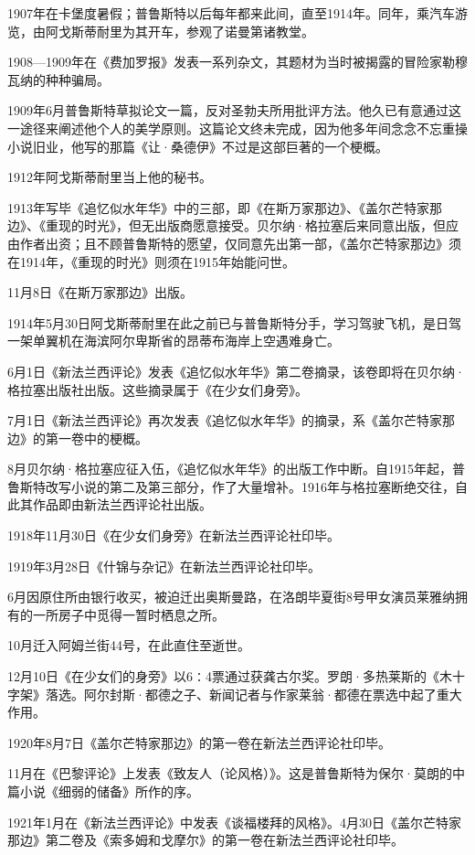 \par 1907年在卡堡度暑假；普鲁斯特以后每年都来此间，直至1914年。同年，乘汽车游览，由阿戈斯蒂耐里为其开车，参观了诺曼第诸教堂。
\par 1908—1909年在《费加罗报》发表一系列杂文，其题材为当时被揭露的冒险家勒穆瓦纳的种种骗局。
\par 1909年6月普鲁斯特草拟论文一篇，反对圣勃夫所用批评方法。他久已有意通过这一途径来阐述他个人的美学原则。这篇论文终未完成，因为他多年间念念不忘重操小说旧业，他写的那篇《让·桑德伊》不过是这部巨著的一个梗概。
\par 1912年阿戈斯蒂耐里当上他的秘书。
\par 1913年写毕《追忆似水年华》中的三部，即《在斯万家那边》、《盖尔芒特家那边》、《重现的时光》，但无出版商愿意接受。贝尔纳·格拉塞后来同意出版，但应由作者出资；且不顾普鲁斯特的愿望，仅同意先出第一部，《盖尔芒特家那边》须在1914年，《重现的时光》则须在1915年始能问世。
\par 11月8日《在斯万家那边》出版。
\par 1914年5月30日阿戈斯蒂耐里在此之前已与普鲁斯特分手，学习驾驶飞机，是日驾一架单翼机在海滨阿尔卑斯省的昂蒂布海岸上空遇难身亡。
\par 6月1日《新法兰西评论》发表《追忆似水年华》第二卷摘录，该卷即将在贝尔纳·格拉塞出版社出版。这些摘录属于《在少女们身旁》。
\par 7月1日《新法兰西评论》再次发表《追忆似水年华》的摘录，系《盖尔芒特家那边》的第一卷中的梗概。
\par 8月贝尔纳·格拉塞应征入伍，《追忆似水年华》的出版工作中断。自1915年起，普鲁斯特改写小说的第二及第三部分，作了大量增补。1916年与格拉塞断绝交往，自此其作品即由新法兰西评论社出版。
\par 1918年11月30日《在少女们身旁》在新法兰西评论社印毕。
\par 1919年3月28日《什锦与杂记》在新法兰西评论社印毕。
\par 6月因原住所由银行收买，被迫迁出奥斯曼路，在洛朗毕夏街8号甲女演员莱雅纳拥有的一所房子中觅得一暂时栖息之所。
\par 10月迁入阿姆兰街44号，在此直住至逝世。
\par 12月10日《在少女们的身旁》以6∶4票通过获龚古尔奖。罗朗·多热莱斯的《木十字架》落选。阿尔封斯·都德之子、新闻记者与作家莱翁·都德在票选中起了重大作用。
\par 1920年8月7日《盖尔芒特家那边》的第一卷在新法兰西评论社印毕。
\par 11月在《巴黎评论》上发表《致友人（论风格）》。这是普鲁斯特为保尔·莫朗的中篇小说《细弱的储备》所作的序。
\par 1921年1月在《新法兰西评论》中发表《谈福楼拜的风格》。4月30日《盖尔芒特家那边》第二卷及《索多姆和戈摩尔》的第一卷在新法兰西评论社印毕。
